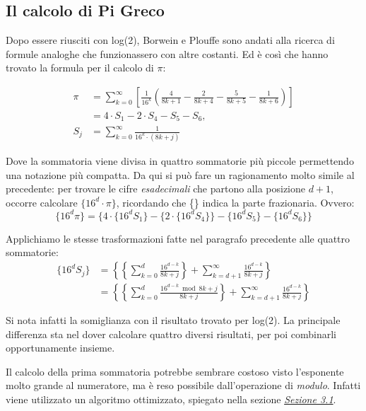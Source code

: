 \subsection{Il calcolo di Pi Greco}
Dopo essere riusciti con log(2), Borwein e Plouffe sono andati alla ricerca di formule analoghe che funzionassero con altre costanti. Ed è così che hanno trovato la formula per il calcolo di $\pi$:

\begin{equation*}
\begin{split}
\pi 
& = \sum\limits_{k=0}^{\infty} \left[ \frac{1}{16^k}\left( \frac{4}{8k+1} - \frac{2}{8k+4} - \frac{5}{8k+5} - \frac{1}{8k+6} \right) \right] \\
& =
4 \cdot S_1 - 2 \cdot S_4 - S_5 - S_6, \\
S_j & = \sum\limits_{k=0}^{\infty} \frac{1}{16^k \cdot (8k+j)}
\end{split}
\end{equation*}

Dove la sommatoria viene divisa in quattro sommatorie più piccole permettendo una notazione più compatta.
\bigbreak
Da qui si può fare un ragionamento molto simile al precedente: per trovare le cifre \textit{esadecimali} che partono alla posizione $d+1$, occorre calcolare $\{16^d \cdot \pi\}$, ricordando che \{\} indica la parte frazionaria. Ovvero:
\begin{equation*}
\{16^d\pi\} =
\{4 \cdot \{16^dS_1\} - \{2 \cdot \{16^dS_4\}\} - \{16^dS_5\} - \{16^dS_6\}\}
\end{equation*}

Applichiamo le stesse trasformazioni fatte nel paragrafo precedente alle quattro sommatorie:
\begin{equation*}
\begin{split}
\{16^dS_j\} & = \left\{\left\{\sum\limits_{k=0}^d \frac{16^{d-k}}{8k+j}\right\} + \sum\limits_{k=d+1}^\infty \frac{16^{d-k}}{8k+j}\right\} \\
& = \left\{\left\{\sum\limits_{k=0}^d \frac{16^{d-k}\bmod{8k+j}}{8k+j}\right\} + \sum\limits_{k=d+1}^\infty \frac{16^{d-k}}{8k+j}\right\}
\end{split}
\end{equation*}

Si nota infatti la somiglianza con il risultato trovato per log(2). La principale differenza sta nel dover calcolare quattro diversi risultati, per poi combinarli opportunamente insieme.

Il calcolo della prima sommatoria potrebbe sembrare costoso visto l'esponente molto grande al numeratore, ma è reso possibile dall'operazione di \textit{modulo}. Infatti viene utilizzato un algoritmo ottimizzato, spiegato nella sezione \hyperref[sec:impl_pot]{\textit{Sezione 3.1}}.
